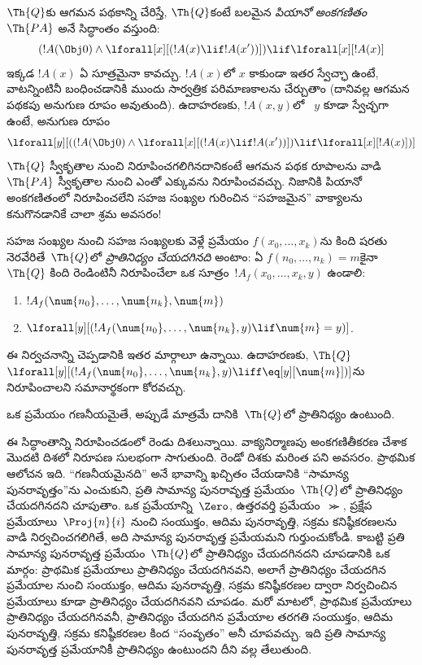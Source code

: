 \documentclass[../../../include/open-logic-section]{subfiles}
\begin{document}
$\Th{Q}$కు ఆగమన పథకాన్ని చేరిస్తే, $\Th{Q}$కంటే బలమైన \emph{పియానో
అంకగణితం}~$\Th{PA}$ అనే సిద్ధాంతం వస్తుంది:
\[
(!A(\Obj 0) \land \lforall[x][(!A(x) \lif !A(x'))]) \lif \lforall[x][!A(x)]
\]
ఇక్కడ $!A(x)$ ఏ సూత్రమైనా కావచ్చు. $!A(x)$లో $x$ కాకుండా ఇతర స్వేచ్ఛా
 ఉంటే, వాటన్నింటినీ బంధించడానికి ముందు సార్వత్రిక పరిమాణకాలను
చేర్చుతాం (దానివల్ల ఆగమన పథకపు అనుగుణ రూపం  అవుతుంది).
ఉదాహరణకు, $!A(x,y)$లో ~$y$ కూడా స్వేచ్ఛగా ఉంటే, అనుగుణ రూపం
\[
\lforall[y][((!A(\Obj 0) \land \lforall[x][(!A(x) \lif !A(x'))]) \lif
  \lforall[x][!A(x)])]
\]
$\Th{Q}$ స్వీకృతాల నుంచి నిరూపించగలిగినదానికంటే ఆగమన పథక రూపాలను వాడి
$\Th{PA}$ స్వీకృతాల నుంచి ఎంతో ఎక్కువను నిరూపించవచ్చు. నిజానికి పియానో
అంకగణితంలో నిరూపించలేని సహజ సంఖ్యల గురించిన ``సహజమైన'' వాక్యాలను కనుగొనడానికే
చాలా శ్రమ అవసరం!{}

\begin{defn}
  సహజ సంఖ్యల నుంచి సహజ సంఖ్యలకు వెళ్లే ప్రమేయం
  $f(x_0,\ldots,x_k)$ను కింది షరతు నెరవేరితే~$\Th{Q}$లో
  \emph{ప్రాతినిధ్యం చేయదగినది} అంటాం: ఏ
  $f(n_0,\dots,n_k)=m$కైనా $\Th{Q}$ కింది రెండింటినీ నిరూపించేలా ఒక
  సూత్రం~$!A_f(x_0,\dots,x_k,y)$ ఉండాలి:
\begin{enumerate}
\item{} $!A_f(\num{n_0}, \dots, \num{n_k}, \num{m})$
\item{} $\lforall[y][(!A_f(\num{n_0}, \dots,
\num{n_k}, y) \lif \num{m} = y)]$.
\end{enumerate}
\end{defn}

ఈ నిర్వచనాన్ని చెప్పడానికి ఇతర మార్గాలూ ఉన్నాయి. ఉదాహరణకు, $\Th{Q}$
$\lforall[y][(!A_f(\num{n_0}, \dots, \num{n_k}, y) \liff
\eq[y][\num{m}])]$ను నిరూపించాలని సమానార్థకంగా కోరవచ్చు.

\begin{thm}
ఒక ప్రమేయం గణనీయమైతే, అప్పుడే మాత్రమే దానికి~$\Th{Q}$లో ప్రాతినిధ్యం ఉంటుంది.
\end{thm}

ఈ సిద్ధాంతాన్ని నిరూపించడంలో రెండు దిశలున్నాయి. వాక్యనిర్మాణపు
అంకగణితీకరణ చేశాక మొదటి దిశలో నిరూపణ సులభంగా సాగుతుంది.
రెండో దిశకు మరింత పని అవసరం. ప్రాథమిక ఆలోచన ఇది. ``గణనీయమైనది'' అనే భావాన్ని
ఖచ్చితం చేయడానికి ``సామాన్య పునరావృత్తం''ను ఎంచుకుని, ప్రతి సామాన్య పునరావృత్త
ప్రమేయం~$\Th{Q}$లో ప్రాతినిధ్యం చేయదగినదని చూపుతాం. ఒక ప్రమేయాన్ని~$\Zero$,
ఉత్తరవర్తి ప్రమేయం~$\Succ$, ప్రక్షేప ప్రమేయాలు~$\Proj{n}{i}$ నుంచి సంయుక్తం,
ఆదిమ పునరావృత్తి, సక్రమ కనిష్ఠీకరణలను వాడి నిర్వచించగలిగితే, అది సామాన్య
పునరావృత్త ప్రమేయమని గుర్తుంచుకోండి. కాబట్టి ప్రతి సామాన్య పునరావృత్త
ప్రమేయం~$\Th{Q}$లో ప్రాతినిధ్యం చేయదగినదని చూపడానికి ఒక మార్గం: ప్రాథమిక
ప్రమేయాలు ప్రాతినిధ్యం చేయదగినవని, అలాగే ప్రాతినిధ్యం చేయదగిన ప్రమేయాల నుంచి
సంయుక్తం, ఆదిమ పునరావృత్తి, సక్రమ కనిష్ఠీకరణల ద్వారా నిర్వచించిన ప్రమేయాలు
కూడా ప్రాతినిధ్యం చేయదగినవని చూపడం. మరో మాటలో, ప్రాథమిక ప్రమేయాలు
ప్రాతినిధ్యం చేయదగినవనీ, ప్రాతినిధ్యం చేయదగిన ప్రమేయాల తరగతి సంయుక్తం,
ఆదిమ పునరావృత్తి, సక్రమ కనిష్ఠీకరణల కింద ``సంవృతం'' అనీ చూపవచ్చు. ఇది ప్రతి
సామాన్య పునరావృత్త ప్రమేయానికీ ప్రాతినిధ్యం ఉంటుందని దీని వల్ల తేలుతుంది.
\end{document}
